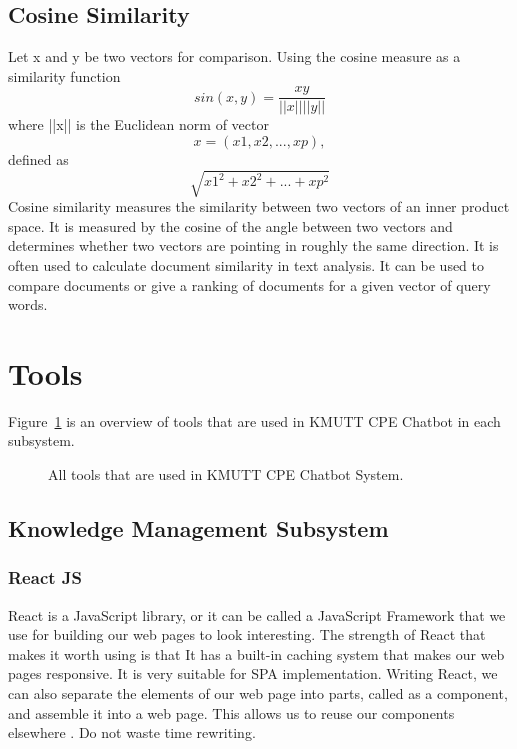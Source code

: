 \documentclass[12pt,oneside,openright,a4paper]{cpe-english-project}
\begin{document}
\subsection{Cosine Similarity}
Let x and y be two vectors for comparison. Using the cosine measure as a similarity function
\[sin(x,y) = \frac{xy}{||x||||y||}\]
where ||x|| is the Euclidean norm of vector
\[x =(x1, x2, ..., xp),\] defined as \[\sqrt{x1^2+x2^2+...+xp^2}\]
Cosine similarity measures the similarity between two vectors of an inner product space.\cite{cosine} It is measured by the cosine of the angle between two vectors and determines whether two vectors are pointing in roughly the same direction. It is often used to calculate document similarity in text analysis. It can be used to compare documents or give a ranking of documents for a given vector of query words.

\section{Tools}
Figure~\ref*{fig:ch3_tools} is an overview of tools that are used in KMUTT CPE Chatbot in each subsystem.
\begin{figure}[h!]
  \centering
  \setlength{\fboxrule}{0.2mm}
  \setlength{\fboxsep}{0.5cm}
  \caption{All tools that are used in KMUTT CPE Chatbot System.}
  \label{fig:ch3_tools}
\end{figure}

\subsection{Knowledge Management Subsystem}
\subsubsection{React JS}
React is a JavaScript library, or it can be called a JavaScript Framework that we use for building
our web pages to look interesting. The strength of React that makes it worth using is that It has
a built-in caching system that makes our web pages responsive. It is very suitable for SPA
implementation. Writing React, we can also separate the elements of our web page into parts,
called as a component, and assemble it into a web page. This allows us to reuse our components
elsewhere \cite{what_is_react}. Do not waste time rewriting.
\end{document}
